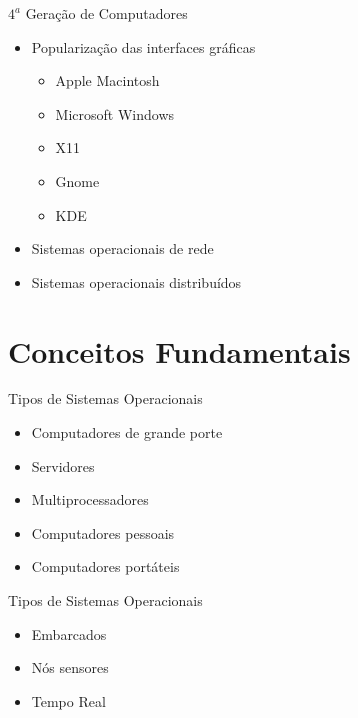 \documentclass[aspectratio=169,
				xcolor=table]{beamer}
\begin{document}
	\begin{frame}{${4}^{a}$ Geração de Computadores}
		\begin{itemize}
			\item Popularização das interfaces gráficas
			\begin{itemize}
				\item Apple Macintosh
				\item Microsoft Windows
				\item X11
				\item Gnome
				\item KDE
			\end{itemize}
			\vspace{1em}
			\item Sistemas operacionais de rede
			\vspace{1em}
			\item Sistemas operacionais distribuídos
		\end{itemize}
	\end{frame}

	\section{Conceitos Fundamentais}
	
	\begin{frame}{Tipos de Sistemas Operacionais}
	\begin{itemize}
		\item Computadores de grande porte			
		\vspace{0.45em}
		\item Servidores					
		\vspace{0.45em}
		\item Multiprocessadores			
		\vspace{0.45em}
		\item Computadores pessoais
		\vspace{0.45em}		
		\item Computadores portáteis
		
	\end{itemize}
	\end{frame}

	\begin{frame}{Tipos de Sistemas Operacionais}
	\begin{itemize}
		\item Embarcados
		\vspace{0.45em}
		\item Nós sensores
		\vspace{0.45em}
		\item Tempo Real
		
	\end{itemize}
	\end{frame}	
	
\end{document}
